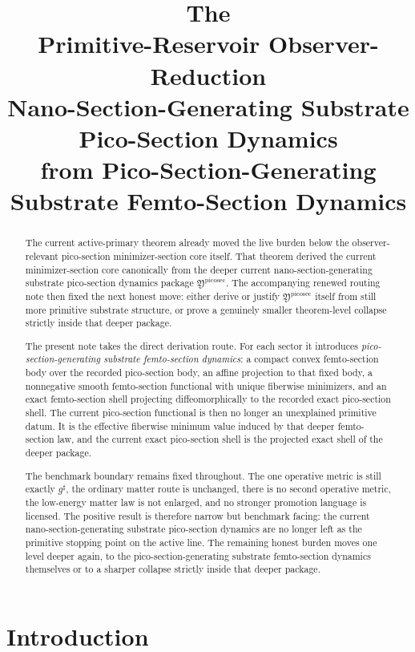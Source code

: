\documentclass[11pt]{article}
\title{\textbf{The \TheoryName{}}\\[0.4em]
\large Primitive-Reservoir Observer-Reduction\\
\large Nano-Section-Generating Substrate Pico-Section Dynamics\\
\large from Pico-Section-Generating Substrate Femto-Section Dynamics}
\author{}
\date{}
\newcommand{\CompletedMetric}{g^{\sharp}}
\newcommand{\PicoSectionPackage}{\mathfrak Y^{\mathrm{picosec}}}
\begin{document}
\maketitle

\begin{abstract}
The current active-primary theorem already moved the live burden below the observer-relevant pico-section minimizer-section core itself. That theorem derived the current minimizer-section core canonically from the deeper current nano-section-generating substrate pico-section dynamics package \(\PicoSectionPackage\). The accompanying renewed routing note then fixed the next honest move: either derive or justify \(\PicoSectionPackage\) itself from still more primitive substrate structure, or prove a genuinely smaller theorem-level collapse strictly inside that deeper package.

The present note takes the direct derivation route. For each sector it introduces \emph{pico-section-generating substrate femto-section dynamics}: a compact convex femto-section body over the recorded pico-section body, an affine projection to that fixed body, a nonnegative smooth femto-section functional with unique fiberwise minimizers, and an exact femto-section shell projecting diffeomorphically to the recorded exact pico-section shell. The current pico-section functional is then no longer an unexplained primitive datum. It is the effective fiberwise minimum value induced by that deeper femto-section law, and the current exact pico-section shell is the projected exact shell of the deeper package.

The benchmark boundary remains fixed throughout. The one operative metric is still exactly \(\CompletedMetric\), the ordinary matter route is unchanged, there is no second operative metric, the low-energy matter law is not enlarged, and no stronger promotion language is licensed. The positive result is therefore narrow but benchmark facing: the current nano-section-generating substrate pico-section dynamics are no longer left as the primitive stopping point on the active line. The remaining honest burden moves one level deeper again, to the pico-section-generating substrate femto-section dynamics themselves or to a sharper collapse strictly inside that deeper package.
\end{abstract}

\section{Introduction}
\end{document}
